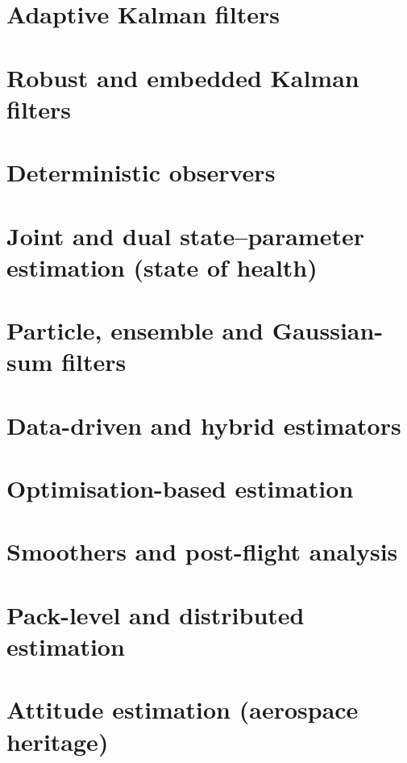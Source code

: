 \documentclass[11pt,a4paper,twoside,openany]{book}
\begin{document}
\part{Adaptive Kalman filters}


\part{Robust and embedded Kalman filters}


\part{Deterministic observers}


\part{Joint and dual state--parameter estimation (state of health)}


\part{Particle, ensemble and Gaussian-sum filters}


\part{Data-driven and hybrid estimators}


\part{Optimisation-based estimation}


\part{Smoothers and post-flight analysis}


\part{Pack-level and distributed estimation}


\part{Attitude estimation (aerospace heritage)}

\end{document}
